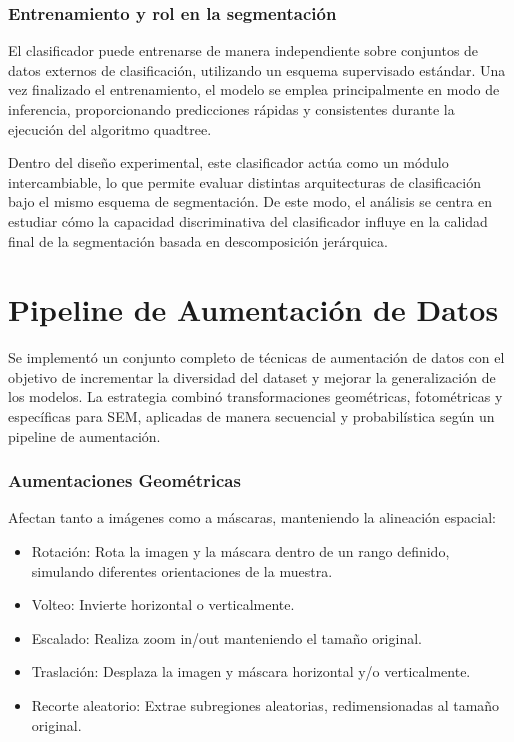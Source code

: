 \documentclass[onecolumn, 12pt , journal]{IEEEtran}
\begin{document}
\subsubsection{Entrenamiento y rol en la segmentación}

El clasificador puede entrenarse de manera independiente sobre conjuntos de datos externos de clasificación, utilizando un esquema supervisado estándar. Una vez finalizado el entrenamiento, el modelo se emplea principalmente en modo de inferencia, proporcionando predicciones rápidas y consistentes durante la ejecución del algoritmo quadtree.

Dentro del diseño experimental, este clasificador actúa como un módulo intercambiable, lo que permite evaluar distintas arquitecturas de clasificación bajo el mismo esquema de segmentación. De este modo, el análisis se centra en estudiar cómo la capacidad discriminativa del clasificador influye en la calidad final de la segmentación basada en descomposición jerárquica.



\section{Pipeline de Aumentación de Datos}
Se implementó un conjunto completo de técnicas de aumentación de datos con el objetivo de incrementar la diversidad del dataset y mejorar la generalización de los modelos. La estrategia combinó transformaciones geométricas, fotométricas y específicas para SEM, aplicadas de manera secuencial y probabilística según un pipeline de aumentación.

\subsubsection{Aumentaciones Geométricas}
Afectan tanto a imágenes como a máscaras, manteniendo la alineación espacial:

\begin{itemize}
    \item Rotación: Rota la imagen y la máscara dentro de un rango definido, simulando diferentes orientaciones de la muestra.
    \item Volteo: Invierte horizontal o verticalmente.
    \item Escalado: Realiza zoom in/out manteniendo el tamaño original.
    \item Traslación: Desplaza la imagen y máscara horizontal y/o verticalmente.
    \item Recorte aleatorio: Extrae subregiones aleatorias, redimensionadas al tamaño original.
\end{itemize}
\end{document}
